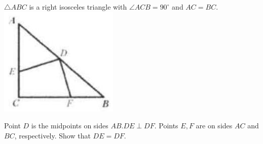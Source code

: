 \documentclass{article}
\begin{document}
\(\triangle A B C\) is a right isosceles triangle with \(\angle A C B=90^{\circ}\) and \(A C=B C\).\\
\centering
\includegraphics[width=\textwidth]{images/012(3).jpg}

Point \(D\) is the midpoints on sides \(A B . D E \perp D F\). Points \(E, F\) are on sides \(A C\) and \(B C\), respectively. Show that \(D E=D F\).
\end{document}
